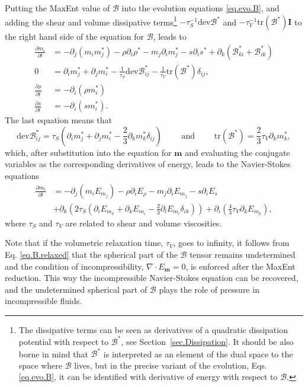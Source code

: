\documentclass[twoside]{article}
\newcommand{\mm}{{\boldsymbol{m}}}
\newcommand{\BBB}{{\mathcal{B}}}
\newcommand{\BBBB}{{\bm{\mathcal{B}}}}
\newcommand{\BBBdev}{{\mathrm{dev}\mathcal{B}}}
\newcommand{\BBBBdev}{{\text{dev}\bm{\mathcal{B}}}}
\newcommand{\ted}{E} %
\newcommand{\pd}{\partial}
\newcommand{\UM}{\bm{I}}
\newcommand{\Tr}{\text{tr}}
\begin{document}
Putting the MaxEnt value of $\BBBB$ into the evolution equations 
\eqref{eq.evo.B}, 
and 
adding the shear and volume dissipative terms\footnote{The dissipative terms 
can be seen as derivatives of a quadratic dissipation potential with respect to 
$\BBBB^*$, see Section~\ref{sec.Dissipation}. It should be also borne in mind that 
$\BBBB^*$ is interpreted as an element of the dual space to the space where $\BBBB$ lives, 
but in the precise variant of the evolution, Eqs. \eqref{eq.evo.B}, it can be identified with
derivative of energy with respect to $\BBBB$.} $-\tau_S^{-1} \BBBBdev^*$ and 
$-\tau^{-1}_V\Tr(\BBBB^*)\UM$ to the 
right hand side of the equation for $\BBBB$, leads to 
\begin{subequations}\label{eq.evo.B.MaxEnt}
\begin{align}
\frac{\pd m_i}{\pd t} &= 
-\pd_j(m_i m^*_j) - \rho\pd_i \rho^* -m_j 
\pd_i m^*_j - s\pd_i s^* 
+\pd_k\left(\BBB^*_{ki}+\BBB^*_{ik}\right)\\
\label{eq.B.relaxed}0 &= 
\pd_i m^*_j + \pd_j m^*_i - 
\frac{1}{\tau_S}\BBBdev^*_{ij}-\frac{1}{\tau_V}\Tr(\BBBB^*)\delta_{ij},\\
\frac{\pd \rho}{\pd t} &= -\pd_i(\rho m^*_i)\\
\frac{\pd s}{\pd t} &= -\pd_i(s m^*_i).
\end{align}
\end{subequations}
The last equation means that
\begin{equation}
\BBBdev^*_{ij} = \tau_S\left(\pd_i m^*_j + \pd_j m^*_i - \frac{2}{3}\pd_k m^*_k \delta_{ij}\right) 
\qquad\mbox{ and }\qquad 
\Tr(\BBBB^*)=\frac{2}{3}\tau_V \pd_k m^*_k,
\end{equation}
which, after substitution into the equation for $\mm$ and evaluating the conjugate variables as the corresponding derivatives of energy, leads to the Navier-Stokes equations 
\begin{align}
\frac{\pd m_i}{\pd t} &= 
-\pd_j(m_i \ted_{m_j}) - \rho\pd_i \ted_\rho -m_j 
\pd_i \ted_{m_j} - s\pd_i \ted_s \nonumber\\
&+\pd_k\left(2\tau_S \left(\pd_i \ted_{m_k} + \pd_k \ted_{m_i}-\frac{2}{3}\pd_l \ted_{m_l}\delta_{ik}\right)\right)
+\pd_i\left(\frac{4}{3}\tau_V \pd_k \ted_{m_k}\right),
\end{align}
where $\tau_S$ and $\tau_V$ are  related to shear and volume viscosities. 

Note that if the volumetric relaxation time, $\tau_V$, goes to infinity, it follows from Eq. \eqref{eq.B.relaxed} that the spherical part of the $\BBBB$ tensor 
remains undetermined and the condition of incompressibility, $\nabla\cdot \ted_{\mm}=0$,
is enforced after the MaxEnt reduction.  This way the incompressible Navier-Stokes 
equation can be recovered, and the undetermined spherical part of $\BBBB$ 
plays the role of pressure in incompressible fluids.
\end{document}
